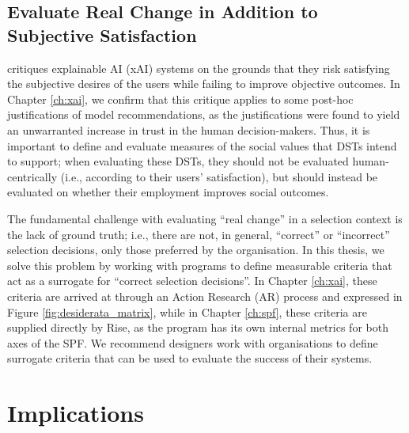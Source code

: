 \subsection{Evaluate Real Change in Addition to Subjective Satisfaction}\label{ssec:real_change}
\textcite{Lipton} critiques explainable AI (xAI) systems on the grounds that they risk satisfying the subjective desires of the users while failing to improve objective outcomes. In Chapter \ref{ch:xai}, we confirm that this critique applies to some post-hoc justifications of model recommendations, as the justifications were found to yield an unwarranted increase in trust in the human decision-makers. Thus, it is important to define and evaluate measures of the social values that DSTs intend to support; when evaluating these DSTs, they should not be evaluated human-centrically (i.e., according to their users' satisfaction), but should instead be evaluated on whether their employment improves social outcomes.

The fundamental challenge with evaluating ``real change'' in a selection context is the lack of ground truth; i.e., there are not, in general, ``correct'' or ``incorrect'' selection decisions, only those preferred by the organisation. In this thesis, we solve this problem by working with programs to define measurable criteria that act as a surrogate for ``correct selection decisions''. In Chapter \ref{ch:xai}, these criteria are arrived at through an Action Research (AR) process and expressed in Figure \ref{fig:desiderata_matrix}, while in Chapter \ref{ch:spf}, these criteria are supplied directly by Rise, as the program has its own internal metrics for both axes of the SPF. We recommend designers work with organisations to define surrogate criteria that can be used to evaluate the success of their systems.

\section{Implications}

